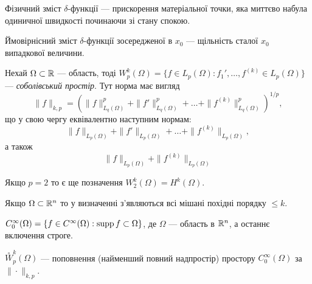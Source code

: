 \begin{remark}
    Фізичний зміст $\delta$-функції --- прискорення матеріальної точки, яка миттєво набула одиничної швидкості починаючи зі стану спокою.
\end{remark}

\begin{remark}
    Ймовірнісний зміст $\delta$-функції зосередженої в $x_0$ --- щільність сталої $x_0$ випадкової величини.
\end{remark}

\begin{definition}
    Нехай $\Omega \subset \mathbb{R}$ --- область, тоді $W_p^k (\Omega) = \{f \in L_p(\Omega): f_1', \ldots, f^{(k)} \in L_p(\Omega)\}$ --- \textit{соболівський простір}.
    Тут норма має вигляд
    \begin{equation}
        \|f\|_{k,p} = \left( \|f\|_{L_q(\Omega)}^p + \|f'\|_{L_q(\Omega)}^p + \ldots + \|f^{(k)}\|_{L_q(\Omega)}^p \right)^{1/p},
    \end{equation}
    що у свою чергу еквівалентно наступним нормам:
    \begin{equation}
        \|f\|_{L_p(\Omega)} + \|f'\|_{L_p(\Omega)} + \ldots + \|f^{(k)}\|_{L_p(\Omega)},
    \end{equation}
    а також
    \begin{equation}
        \|f\|_{L_p(\Omega)} + \|f^{(k)}\|_{L_p(\Omega)}
    \end{equation}
\end{definition}

\begin{remark}
    Якщо $p = 2$ то є ще позначення $W_2^k(\Omega) = H^k(\Omega)$.
\end{remark}

\begin{remark}
    Якщо $\Omega \subset \mathbb{R}^n$ то у визначенні з'являються всі мішані похідні порядку $\le k$.
\end{remark}

\begin{definition}
    $C_0^\infty(\Omega) = \{f \in C^\infty(\Omega): \operatorname{supp} f \subset \Omega\}$, де $\Omega$ --- область в $\mathbb{R}^n$, а останнє включення строге.
\end{definition}

\begin{definition}
    $\overset{\circ}{W}_p^k(\Omega)$ --- поповнення (найменший повний надпростір) простору $C_0^\infty(\Omega)$ за $\|\cdot\|_{k,p}$.
\end{definition}


